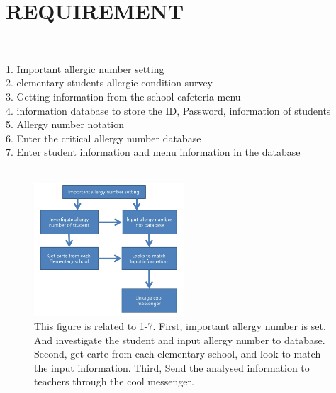 \documentclass[a4paper,11pt]{IEEEtran}
\begin{document}
\section{REQUIREMENT}
~\\
{\large
1. Important allergic number setting \\
2. elementary students allergic condition survey \\
3. Getting information from the school cafeteria menu\\
4. information database to store the ID, Password, information of students\\
5. Allergy number notation\\
6. Enter the critical allergy number database\\
7. Enter student information and menu information in the database\\
~\\
\begin{figure}[!h]
        \centering
        \includegraphics[width=0.5\textwidth, height=0.5\textheight]{s1.jpg}
        \caption{This figure is related to 1-7. First, important allergy number is set. And investigate the student and input allergy number to database. Second, get carte from each elementary school, and look to match the input information. Third, Send the analysed information to teachers through the cool messenger.}
        \label{fig1}
\end{figure}

}
\end{document}
